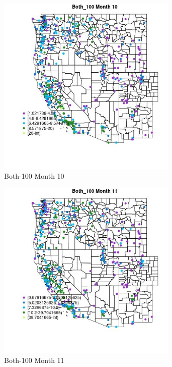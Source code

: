 \begin{figure} 
\centering  
\includegraphics[width=0.77\textwidth]{Code_Outputs/ML_input_report_ML_input_PM25_Step5_part_d_de_duplicated_aves_ML_input_MapObsMo10Both_100.jpg} 
\caption{\label{fig:ML_input_report_ML_input_PM25_Step5_part_d_de_duplicated_aves_ML_inputMapObsMo10Both_100}Both-100 Month 10} 
\end{figure} 
 

\begin{figure} 
\centering  
\includegraphics[width=0.77\textwidth]{Code_Outputs/ML_input_report_ML_input_PM25_Step5_part_d_de_duplicated_aves_ML_input_MapObsMo11Both_100.jpg} 
\caption{\label{fig:ML_input_report_ML_input_PM25_Step5_part_d_de_duplicated_aves_ML_inputMapObsMo11Both_100}Both-100 Month 11} 
\end{figure} 
 

